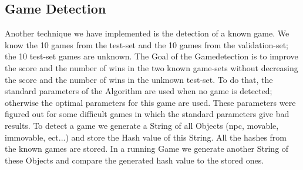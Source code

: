   
  
\subsection{Game Detection} 
  
Another technique we have implemented is the detection of a known game. We know the 10 games from the test-set and the 10 games from the validation-set; the 10 test-set games are unknown. The Goal of the Gamedetection is to improve the score and the number of wins in the two known game-sets without decreasing the score and the number of wins in the unknown test-set. To do that, the standard parameters of the Algorithm are used when no game is detected; otherwise the optimal parameters for this game are used. These parameters were figured out for some difficult games in which the standard parameters give bad results. To detect a game we generate a String of all Objects (npc, movable, immovable, ect...) and store the Hash value of this String. All the hashes from the known games are stored. In a running Game we generate another String of these Objects and compare the generated hash value to the stored ones. 